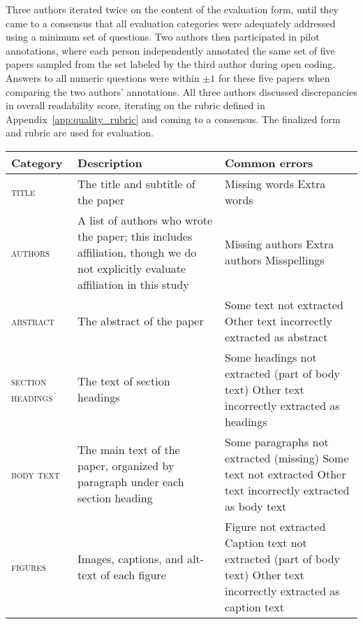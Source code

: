 Three authors iterated twice on the content of the evaluation form, until they came to a consensus that all evaluation categories were adequately addressed using a minimum set of questions. Two authors then participated in pilot annotations, where each person independently annotated the same set of five papers sampled from the set labeled by the third author during open coding. Answers to all numeric questions were within $\pm 1$ for these five papers when comparing the two authors' annotations. All three authors discussed discrepancies in overall readability score, iterating on the rubric defined in Appendix~\ref{app:quality_rubric} and coming to a consensus. The finalized form and rubric are used for evaluation.

\begin{table}[t!]
    \small
    \centering
    \begin{tabularx}{\linewidth}{L{20mm}L{65mm}X}
        \toprule
        \textbf{Category} & \textbf{Description} & \textbf{Common errors} \\
        \midrule 
        \textsc{title} & The title and subtitle of the paper & Missing words \newline Extra words \\ 
        \midrule
        \textsc{authors} & A list of authors who wrote the paper; this includes affiliation, though we do not explicitly evaluate affiliation in this study & Missing authors \newline Extra authors \newline Misspellings \\
        \midrule
        \textsc{abstract} & The abstract of the paper & Some text not extracted \newline Other text incorrectly extracted as abstract \\
        \midrule
        \textsc{section headings} & The text of section headings & Some headings not extracted (part of body text) \newline Other text incorrectly extracted as headings \\
        \midrule
        \textsc{body text} & The main text of the paper, organized by paragraph under each section heading & Some paragraphs not extracted (missing) \newline Some text not extracted \newline Other text incorrectly extracted as body text \\
        \midrule
        \textsc{figures} & Images, captions, and alt-text of each figure & Figure not extracted \newline Caption text not extracted (part of body text) \newline Other text incorrectly extracted as caption text \\

\end{tabularx}
\end{table}
